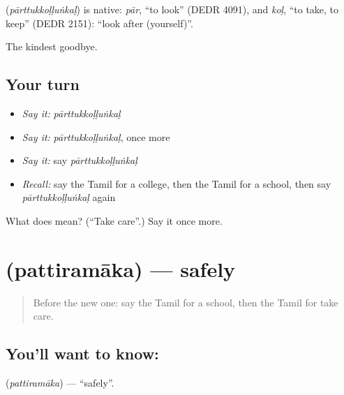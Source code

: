 \begin{cousinweb}
\textbf{} (\emph{pārttukkoḷḷuṅkaḷ}) is native: \emph{pār}, \textquotedblleft{}to look\textquotedblright{} (DEDR 4091), and \emph{koḷ}, \textquotedblleft{}to take, to keep\textquotedblright{} (DEDR 2151): \textquotedblleft{}look after (yourself)\textquotedblright{}.
\end{cousinweb}

\begin{grammarlens}[title={What you've built}]
The kindest goodbye.
\end{grammarlens}

\subsection*{Your turn}
\begin{itemize}
\raggedright
  \item \emph{Say it:} \emph{pārttukkoḷḷuṅkaḷ}
  \item \emph{Say it:} \emph{pārttukkoḷḷuṅkaḷ}, once more
  \item \emph{Say it:} say \emph{pārttukkoḷḷuṅkaḷ}
  \item \emph{Recall:} say the Tamil for a college, then the Tamil for a school, then say \emph{pārttukkoḷḷuṅkaḷ} again
\end{itemize}

\begin{tcolorbox}[breakable,colback=teal!4,colframe=teal!35!black,title={Before you move on}]
What does  mean? (\textquotedblleft{}Take care\textquotedblright{}.) Say it once more.
\end{tcolorbox}
\section[\texorpdfstring{\ta{பத்திரமாக} (pattiramāka)}{பத்திரமாக (pattiramāka)}]{ (pattiramāka) — safely}

\label{lesson:TA-C106-safely}



\begin{quote}
Before the new one: say the Tamil for a school, then the Tamil for take care.
\end{quote}

\subsection*{You'll want to know: }
\textbf{} (\emph{pattiramāka}) — \textquotedblleft{}safely\textquotedblright{}.

